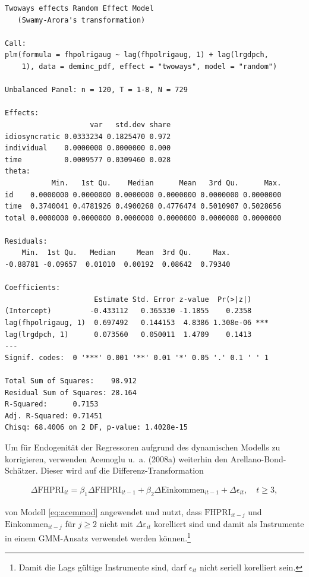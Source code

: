 \documentclass[
  a4paper,
  DIV=11,
  oneside]{scrreprt}
\begin{document}
\begin{verbatim}
Twoways effects Random Effect Model 
   (Swamy-Arora's transformation)

Call:
plm(formula = fhpolrigaug ~ lag(fhpolrigaug, 1) + lag(lrgdpch, 
    1), data = deminc_pdf, effect = "twoways", model = "random")

Unbalanced Panel: n = 120, T = 1-8, N = 729

Effects:
                    var   std.dev share
idiosyncratic 0.0333234 0.1825470 0.972
individual    0.0000000 0.0000000 0.000
time          0.0009577 0.0309460 0.028
theta:
           Min.   1st Qu.    Median      Mean   3rd Qu.      Max.
id    0.0000000 0.0000000 0.0000000 0.0000000 0.0000000 0.0000000
time  0.3740041 0.4781926 0.4900268 0.4776474 0.5010907 0.5028656
total 0.0000000 0.0000000 0.0000000 0.0000000 0.0000000 0.0000000

Residuals:
    Min.  1st Qu.   Median     Mean  3rd Qu.     Max. 
-0.88781 -0.09657  0.01010  0.00192  0.08642  0.79340 

Coefficients:
                     Estimate Std. Error z-value  Pr(>|z|)    
(Intercept)         -0.433112   0.365330 -1.1855    0.2358    
lag(fhpolrigaug, 1)  0.697492   0.144153  4.8386 1.308e-06 ***
lag(lrgdpch, 1)      0.073560   0.050011  1.4709    0.1413    
---
Signif. codes:  0 '***' 0.001 '**' 0.01 '*' 0.05 '.' 0.1 ' ' 1

Total Sum of Squares:    98.912
Residual Sum of Squares: 28.164
R-Squared:      0.7153
Adj. R-Squared: 0.71451
Chisq: 68.4006 on 2 DF, p-value: 1.4028e-15
\end{verbatim}

Um für Endogenität der Regressoren aufgrund des dynamischen Modells zu
korrigieren, verwenden Acemoglu u.~a. (2008a) weiterhin den
Arellano-Bond-Schätzer. Dieser wird auf die Differenz-Transformation

\begin{align}
  \Delta\text{FHPRI}_{it} = \beta_1 \Delta\text{FHPRI}_{it-1} + \beta_2 \Delta\text{Einkommen}_{it-1} + \Delta\epsilon_{it}, \quad t\geq3,\label{eq:acemabmod}
\end{align}

von Modell \eqref{eq:acemmod} angewendet und nutzt, dass
\(\text{FHPRI}_{it-j}\) und \(\text{Einkommen}_{it-j}\) für \(j\geq2\)
nicht mit \(\Delta\varepsilon_{it}\) korelliert sind und damit als
Instrumente in einem GMM-Ansatz verwendet werden können.\footnote{Damit
  die Lags gültige Instrumente sind, darf \(\epsilon_{it}\) nicht
  seriell korelliert sein.}
\end{document}
